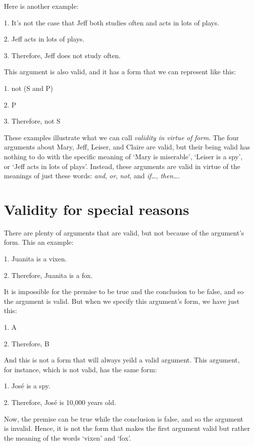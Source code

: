 Here is another example:
	\begin{earg}
		\item[1.] It's not the case that Jeff both studies often and acts in lots of plays.
		\item[2.] Jeff acts in lots of plays.
		\item[3.] Therefore, Jeff does not study often.
	\end{earg}
This argument is also valid, and it has a form that we can represent like this:
	\begin{earg}
		\item[1.] not (S and P)
		\item[2.] P
		\item[3.] Therefore, not S
	\end{earg}
	
These examples illustrate what we can call \emph{validity in virtue of form}. The four arguments about Mary, Jeff, Leiser, and Claire are valid, but their being valid has nothing to do with the specific meaning of `Mary is miserable', `Leiser is a spy', or `Jeff acts in lots of plays'. Instead, these arguments are valid in virtue of the meanings of just these words: \textit{and}, \textit{or}, \textit{not}, and \textit{if\ldots, then\ldots}. 


\section{Validity for special reasons}
There are plenty of arguments that are valid, but not because of the argument's form. This an example:
	\begin{earg}
		\item[1.] Juanita is a vixen.
		\item[2.] Therefore, Juanita is a fox.
	\end{earg}
It is impossible for the premise to be true and the conclusion to be false, and so the argument is valid. But when we specify this argument's form, we have just this: 
	\begin{earg}
		\item[1.] A
		\item[2.] Therefore, B
	\end{earg}
And this is not a form that will always yeild a valid argument. This argument, for instance, which is not valid, has the same form:

\newpage

	\begin{earg}
		\item[1.] Jos\'e is a spy.
		\item[2.] Therefore, Jos\'e is 10,000 years old.
	\end{earg}
Now, the premise can be true while the conclusion is false, and so the argument is invalid. Hence, it is not the form that makes the first argument valid but rather the meaning of the words `vixen' and `fox'. 

